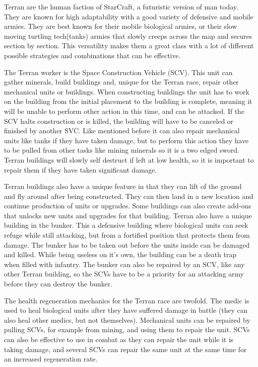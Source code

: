 Terran are the human faction of StarCraft, a futuristic version of man today.
They are known for high adaptability with a good variety of defensive and mobile
armies. They are best known for their mobile biological armies, or their slow
moving turtling tech(tanks) armies that slowly creeps across the map and secures
section by section. This versatility makes them a great class with a lot of
different possible strategies and combinations that can be effective.
 
The Terran worker is the Space Construction Vehicle (SCV). This unit can gather
minerals, build buildings and, unique for the Terran race, repair other
mechanical units or buildings. When constructing buildings the unit has to work
on the building from the initial placement to the building is complete, meaning
it will be unable to perform other action in this time, and can be attacked. If
the SCV halts construction or is killed, the building will have to be canceled
or finished by another SVC. Like mentioned before it can also repair mechanical
units like tanks if they have taken damage, but to perform this action they have
to be pulled from other tasks like mining minerals so it is a two edged sword.
Terran buildings will slowly self destruct if left at low health, so it is
important to repair them if they have taken significant damage.
 
Terran buildings also have a unique feature in that they can lift of the ground
and fly around after being constructed. They can then land in a new location and
continue production of units or upgrades. Some buildings can also create add-ons
that unlocks new units and upgrades for that building. Terran also have a unique
building in the bunker. This a defensive building where  biological units can
seek refuge while still attacking, but from a fortified position that protects
them from damage. The bunker has to be taken out before the units inside can be
damaged and killed. While being useless on it's own, the building can be a death
trap when filled with infantry. The bunker can also be repaired by an SCV, like
any other Terran building, so the SCVs have to be a priority for an attacking
army before they can destroy the bunker.
 
The health regeneration mechanics for the Terran race are twofold. The medic is
used to heal biological units after they have suffered damage in battle (they
can also heal other medics, but not themselves). Mechanical units can be
repaired by pulling SCVs, for example from mining, and using them to repair the
unit. SCVs can also be effective to use in combat as they can repair the unit
while it is taking damage, and several SCVs can repair the same unit at the same
time for an increased regeneration rate.
 
